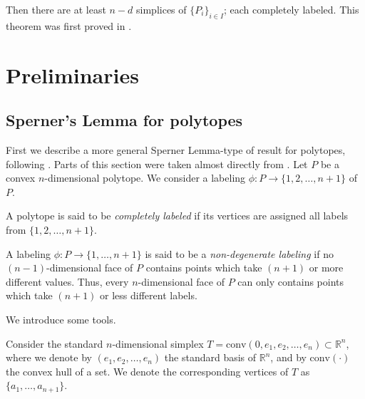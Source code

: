 \documentclass[11pt]{amsart}
\theoremstyle{definition}
\theoremstyle{remark}
\numberwithin{equation}{section}
\theoremstyle{definition}
\begin{document}
	Then there are at least $n-d$ simplices of $\{P_i\}_{i\in I}$; each completely labeled. This theorem was first proved in \cite{Su2002}.  
	
	
	
	
	
	
	\section{Preliminaries}
	
	
	\subsection{Sperner's Lemma for polytopes}\label{sec:bekker}
	First we describe a more general Sperner Lemma-type of result for polytopes, following \cite{Bekker1995}. Parts of this section were taken almost directly from \cite{GS}. Let $P$ be a convex $n$-dimensional  polytope. We consider a labeling $\phi:P\to \{1,2,\ldots, n+1\}$ of $P$.
	
	A polytope is said to be \emph{completely labeled} if  its vertices are assigned all labels from $\{1, 2, \ldots, n+1\}$.
	
	A labeling $\phi:P\to \{1,\ldots,n+1\}$ is said to be a \emph{non-degenerate labeling} if no $(n-1)$-dimensional face of $P$ contains points which take $(n+1)$ or more different values. Thus, every $n$-dimensional face of $P$ can only contains points which take $(n+1)$ or less different labels.
	
	We  introduce some tools.
	
	Consider the standard $n$-dimensional simplex $T=\textrm{conv}(0, e_1,e_2,\ldots ,e_n)\subset \mathbb{R}^n$, where we denote by $(e_1,e_2,\ldots ,e_n)$ the standard basis of $\mathbb{R}^n$, and by $\textrm{conv}(\cdot)$ the convex hull of a set. We denote the corresponding vertices of $T$ as $\{a_1,\ldots, a_{n+1}\}$.   
	
\end{document}
